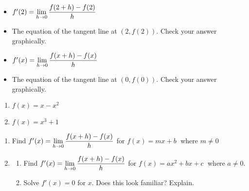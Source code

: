 \begin{itemize}

\item  $f'(2)  = \displaystyle{\lim_{h \rightarrow 0} \dfrac{f(2+h) - f(2)}{h}}$

\item  The equation of the tangent line at $(2, f(2))$.  Check your answer graphically.

\item  $f'(x) = \displaystyle{\lim_{h \rightarrow 0} \dfrac{f(x+h) - f(x)}{h}}$

\item  The equation of the tangent line at $(0,f(0))$.  Check your answer graphically.
 
\end{itemize}



\begin{multicols}{2}
\begin{enumerate}
\setcounter{enumi}{\value{HW}}

\item\label{tangentlinepolyfirst}  $f(x) = x-x^2$ 
\item\label{tangentlinepolylast} $f(x) = x^{3} + 1$

\setcounter{HW}{\value{enumi}}
\end{enumerate}
\end{multicols}




\begin{enumerate}
\setcounter{enumi}{\value{HW}}

\item  Find $f'(x) = \displaystyle{\lim_{h \rightarrow 0} \dfrac{f(x+h) - f(x)}{h}}$  for $f(x) = mx + b\;$ where $m \neq 0$

\item\label{quadraticderivativeformulaexercise} \begin{enumerate}  \item Find $f'(x) = \displaystyle{\lim_{h \rightarrow 0} \dfrac{f(x+h) - f(x)}{h}}$   for  $f(x) = ax^{2} + bx + c\;$ where $a \neq 0$.

\item  Solve $f'(x) = 0$ for $x$.  Does this look familiar?  Explain.

\end{enumerate}

\setcounter{HW}{\value{enumi}}
\end{enumerate}





